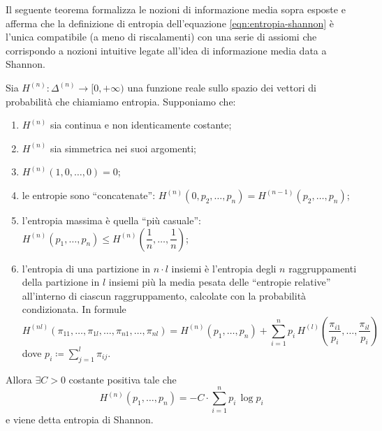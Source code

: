 Il seguente teorema formalizza le nozioni di informazione media sopra esposte e afferma che la definizione di entropia dell'equazione \eqref{eqn:entropia-shannon} è l'unica compatibile (a meno di riscalamenti) con una serie di assiomi che corrispondo a nozioni intuitive legate all'idea di informazione media data a Shannon.

\begin{thm} \label{thm:Shannon}
    Sia $ H^{(n)} \colon \Delta^{(n)} \to [0, +\infty) $ una funzione reale sullo spazio dei vettori di probabilità che chiamiamo entropia. Supponiamo che:    \begin{enumerate}[label=(\roman*)]
        \item\label{pt:continua} $ H^{(n)} $ sia continua e non identicamente costante;
        \item $ H^{(n)} $ sia simmetrica nei suoi argomenti;
        \item $ H^{(n)}(1, 0, \ldots, 0) = 0 $;
        \item\label{pt:concat} le entropie sono ``concatenate'': $ H^{(n)}(0, p_2, \ldots, p_n) = H^{(n-1)}(p_2, \ldots, p_n) $;
        \item\label{pt:max} l'entropia massima è quella ``più casuale'': $ H^{(n)}(p_1, \ldots, p_n) \leq H^{(n)}\left(\dfrac{1}{n}, \ldots, \dfrac{1}{n}\right) $;
        \item\label{pt:formula} l'entropia di una partizione in $ n \cdot l $ insiemi è l'entropia degli $ n $ raggruppamenti della partizione in $ l $ insiemi più la media pesata delle ``entropie relative'' all'interno di ciascun raggruppamento, calcolate con la probabilità condizionata. In formule
        \[
            H^{(nl)}(\pi_{11}, \ldots, \pi_{1l}, \ldots, \pi_{n1}, \ldots, \pi_{nl}) = H^{(n)}(p_1, \ldots, p_n) + \sum_{i=1}^{n} p_i \, H^{(l)} \left(\dfrac{\pi_{i1}}{p_i}, \ldots, \dfrac{\pi_{il}}{p_i}\right)
        \]
        dove $ p_i \coloneqq \sum_{j = 1}^{l} \pi_{ij} $.
    \end{enumerate}
    Allora $ \exists C > 0 $ costante positiva tale che
    \[
        H^{(n)}(p_1, \ldots, p_n) = -C \cdot \sum_{i = 1}^{n} p_i \, \log{p_i}
    \]
    e viene detta entropia di Shannon.
\end{thm}
